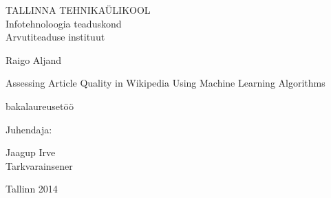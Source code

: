 \begin{titlepage}
	\newcommand{\fontsizetwo}[2]{{\fontsize{#1}{#1}\selectfont #2}}
	\newcommand{\fourteen}[1]{\fontsizetwo{14pt}{#1}}
	\newcommand{\twelve}[1]{\fontsizetwo{12pt}{#1}}
	
	\begin{center}
		\fourteen{TALLINNA TEHNIKAÜLIKOOL \\
		Infotehnoloogia teaduskond \\
		Arvutiteaduse instituut}
		
		\vfill
		
		\fourteen{Raigo Aljand} \\
		
		\vspace{7mm}
		
		\fontsizetwo{20pt}{Assessing Article Quality in Wikipedia
		Using Machine Learning Algorithms} \\
		
		\vspace{7mm}
		
		\twelve{bakalaureusetöö}
		
		\vspace{20mm}
		
		\begin{flushright}
			\twelve{Juhendaja:}
			\begin{minipage}{35mm}
				\fourteen{
				Jaagup Irve \\
				Tarkvarainsener}
			\end{minipage}
		\end{flushright}
		
		\vfill
		
		\twelve{Tallinn 2014}
	\end{center}
\end{titlepage}